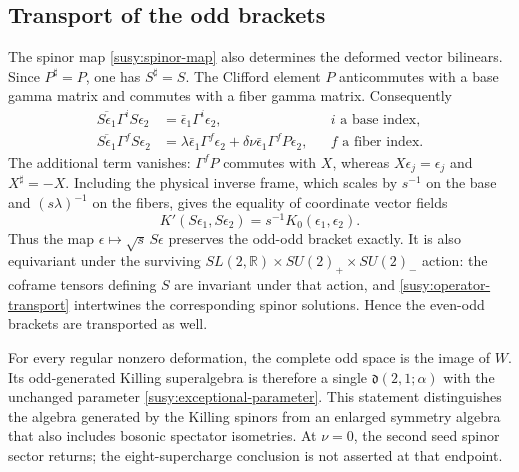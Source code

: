 \subsection{Transport of the odd brackets}

The spinor map \eqref{susy:spinor-map} also determines the deformed vector bilinears. Since $P^\sharp=P$, one has $S^\sharp=S$. The Clifford element $P$ anticommutes with a base gamma matrix and commutes with a fiber gamma matrix. Consequently
\begin{align}
 \overline{S\epsilon_1}\Gamma^iS\epsilon_2
 &=\bar\epsilon_1\Gamma^i\epsilon_2,
 &&i\text{ a base index},\label{susy:base-bilinear}\\
 \overline{S\epsilon_1}\Gamma^fS\epsilon_2
 &=\lambda\bar\epsilon_1\Gamma^f\epsilon_2
   +\delta\nu\bar\epsilon_1\Gamma^fP\epsilon_2,
 &&f\text{ a fiber index}.\label{susy:fiber-bilinear}
\end{align}
The additional term vanishes: $\Gamma^fP$ commutes with $X$, whereas $X\epsilon_j=\epsilon_j$ and $X^\sharp=-X$. Including the physical inverse frame, which scales by $s^{-1}$ on the base and $(s\lambda)^{-1}$ on the fibers, gives the equality of coordinate vector fields
\begin{equation}\label{susy:vector-transport}
 K'(S\epsilon_1,S\epsilon_2)=s^{-1}K_0(\epsilon_1,\epsilon_2).
\end{equation}
Thus the map $\epsilon\mapsto\sqrt{s}\,S\epsilon$ preserves the odd-odd bracket exactly. It is also equivariant under the surviving
$SL(2,\mathbb R)\times SU(2)_+\times SU(2)_-$ action: the coframe tensors defining $S$ are invariant under that action, and \eqref{susy:operator-transport} intertwines the corresponding spinor solutions. Hence the even-odd brackets are transported as well.

For every regular nonzero deformation, the complete odd space is the image of $W$. Its odd-generated Killing superalgebra is therefore a single $\mathfrak d(2,1;\alpha)$ with the unchanged parameter \eqref{susy:exceptional-parameter}. This statement distinguishes the algebra generated by the Killing spinors from an enlarged symmetry algebra that also includes bosonic spectator isometries. At $\nu=0$, the second seed spinor sector returns; the eight-supercharge conclusion is not asserted at that endpoint.
